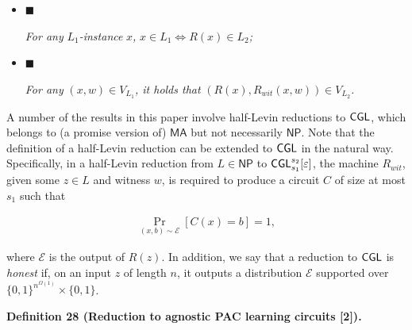 \begin{itemize}


\item[] 
$\blacksquare$ 


\emph{For any }$L_{1}$\emph{-instance }$x$\emph{, }$x\in L_{1}\iff R(x)\in L_{2}$\emph{;}\par





\item[] 
$\blacksquare$ 


\emph{For any }$(x,w)\in V_{L_{1}}$\emph{, it holds that }$(R(x),R_{wit}(x,w))\in V_{L_{2}}$\emph{.}\par





\end{itemize}






A number of the results in this paper involve half-Levin reductions to ${\sf CGL}$, which belongs to (a promise version of) ${\mathsf{MA}}$ but not necessarily ${\mathsf{NP}}$. Note that the definition of a half-Levin reduction can be extended to ${\sf CGL}$ in the natural way. Specifically, in a half-Levin reduction from $L\in{\mathsf{NP}}$ to ${\sf CGL}_{s_{1}}^{s_{2}}[\varepsilon]$, the machine $R_{wit}$, given some $z\in L$ and witness $w$, is required to produce a circuit $C$ of size at most $s_{1}$ such that\par


\[\begin{gathered}
\Pr_{(x,b)\sim\mathcal{E}}[C(x)=b]=1,
\end{gathered}\]


where $\mathcal{E}$ is the output of $R(z)$. In addition, we say that a reduction to ${\sf CGL}$ is \emph{honest} if, on an input $z$ of length $n$, it outputs a distribution $\mathcal{E}$ supported over $\{0,1\}^{n^{\Omega(1)}}\times\{0,1\}$.\par





\par\medskip\noindent\textbf{
\textbf{Definition 28}\textbf{ }(Reduction to agnostic PAC learning circuits [2])\textbf{.}
}\par



